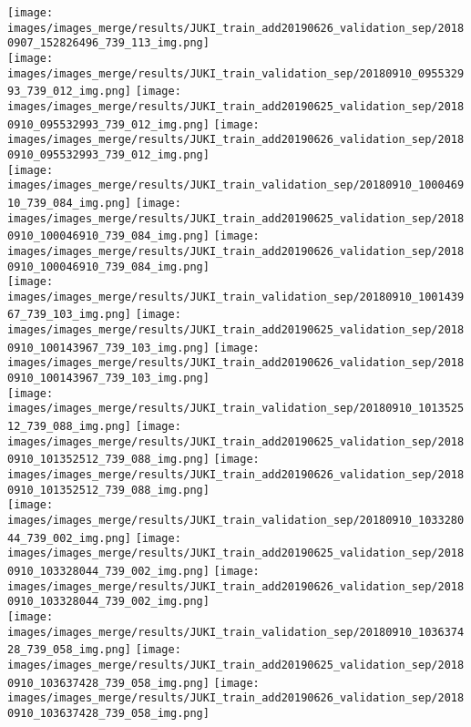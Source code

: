 \begin{center}
\texttt{[image: images/images\_merge/results/JUKI\_train\_add20190626\_validation\_sep/20180907\_152826496\_739\_113\_img.png]}\\
\texttt{[image: images/images\_merge/results/JUKI\_train\_validation\_sep/20180910\_095532993\_739\_012\_img.png]}
\texttt{[image: images/images\_merge/results/JUKI\_train\_add20190625\_validation\_sep/20180910\_095532993\_739\_012\_img.png]}
\texttt{[image: images/images\_merge/results/JUKI\_train\_add20190626\_validation\_sep/20180910\_095532993\_739\_012\_img.png]}\\
\texttt{[image: images/images\_merge/results/JUKI\_train\_validation\_sep/20180910\_100046910\_739\_084\_img.png]}
\texttt{[image: images/images\_merge/results/JUKI\_train\_add20190625\_validation\_sep/20180910\_100046910\_739\_084\_img.png]}
\texttt{[image: images/images\_merge/results/JUKI\_train\_add20190626\_validation\_sep/20180910\_100046910\_739\_084\_img.png]}\\
\texttt{[image: images/images\_merge/results/JUKI\_train\_validation\_sep/20180910\_100143967\_739\_103\_img.png]}
\texttt{[image: images/images\_merge/results/JUKI\_train\_add20190625\_validation\_sep/20180910\_100143967\_739\_103\_img.png]}
\texttt{[image: images/images\_merge/results/JUKI\_train\_add20190626\_validation\_sep/20180910\_100143967\_739\_103\_img.png]}\\
\texttt{[image: images/images\_merge/results/JUKI\_train\_validation\_sep/20180910\_101352512\_739\_088\_img.png]}
\texttt{[image: images/images\_merge/results/JUKI\_train\_add20190625\_validation\_sep/20180910\_101352512\_739\_088\_img.png]}
\texttt{[image: images/images\_merge/results/JUKI\_train\_add20190626\_validation\_sep/20180910\_101352512\_739\_088\_img.png]}\\
\texttt{[image: images/images\_merge/results/JUKI\_train\_validation\_sep/20180910\_103328044\_739\_002\_img.png]}
\texttt{[image: images/images\_merge/results/JUKI\_train\_add20190625\_validation\_sep/20180910\_103328044\_739\_002\_img.png]}
\texttt{[image: images/images\_merge/results/JUKI\_train\_add20190626\_validation\_sep/20180910\_103328044\_739\_002\_img.png]}\\
\texttt{[image: images/images\_merge/results/JUKI\_train\_validation\_sep/20180910\_103637428\_739\_058\_img.png]}
\texttt{[image: images/images\_merge/results/JUKI\_train\_add20190625\_validation\_sep/20180910\_103637428\_739\_058\_img.png]}
\texttt{[image: images/images\_merge/results/JUKI\_train\_add20190626\_validation\_sep/20180910\_103637428\_739\_058\_img.png]}

\end{center}